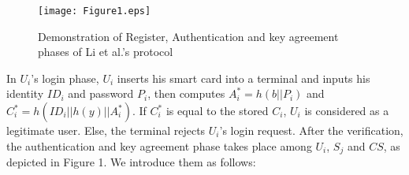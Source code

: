 \documentclass[preprint,12pt]{elsarticle}
\begin{document}
\begin{figure}[!htb]
\begin{center}
\texttt{[image: Figure1.eps]}
\caption{Demonstration of Register, Authentication and key agreement phases of Li et al.'s protocol }
\end{center}
\end{figure}

In $U_i$'s login phase, $U_i$ inserts his smart card into a terminal and inputs his identity $ID_i$ and password $P_i$, then computes $A^*_i=h(b||P_i)$ and $C^*_i=h(ID_i||h(y)||A^*_i)$. If $C^*_i$ is equal to the stored $C_i$, $U_i$ is considered as a legitimate user. Else, the terminal rejects $U_i$'s login request.  After the verification, the authentication and key agreement phase takes place among $U_i$, $S_j$ and $CS$, as depicted in Figure 1. We introduce them as follows:
\end{document}
